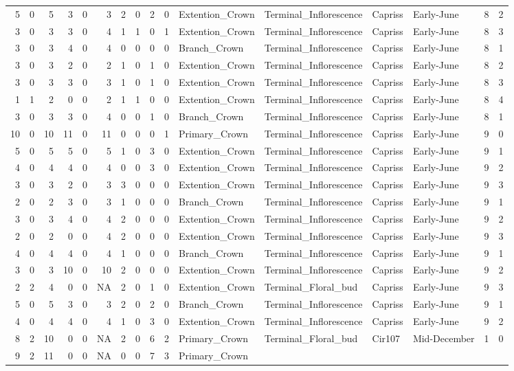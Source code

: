 \documentclass[]{article}
\begin{document}
\begin{longtable}[]{@{}rrrrrrrrrrllllrl@{}}
5 & 0 & 5 & 3 & 0 & 3 & 2 & 0 & 2 & 0 & Extention\_Crown &
Terminal\_Inflorescence & Capriss & Early-June & 8 & 2\tabularnewline
3 & 0 & 3 & 3 & 0 & 4 & 1 & 1 & 0 & 1 & Extention\_Crown &
Terminal\_Inflorescence & Capriss & Early-June & 8 & 3\tabularnewline
3 & 0 & 3 & 4 & 0 & 4 & 0 & 0 & 0 & 0 & Branch\_Crown &
Terminal\_Inflorescence & Capriss & Early-June & 8 & 1\tabularnewline
3 & 0 & 3 & 2 & 0 & 2 & 1 & 0 & 1 & 0 & Extention\_Crown &
Terminal\_Inflorescence & Capriss & Early-June & 8 & 2\tabularnewline
3 & 0 & 3 & 3 & 0 & 3 & 1 & 0 & 1 & 0 & Extention\_Crown &
Terminal\_Inflorescence & Capriss & Early-June & 8 & 3\tabularnewline
1 & 1 & 2 & 0 & 0 & 2 & 1 & 1 & 0 & 0 & Extention\_Crown &
Terminal\_Inflorescence & Capriss & Early-June & 8 & 4\tabularnewline
3 & 0 & 3 & 3 & 0 & 4 & 0 & 0 & 1 & 0 & Branch\_Crown &
Terminal\_Inflorescence & Capriss & Early-June & 8 & 1\tabularnewline
10 & 0 & 10 & 11 & 0 & 11 & 0 & 0 & 0 & 1 & Primary\_Crown &
Terminal\_Inflorescence & Capriss & Early-June & 9 & 0\tabularnewline
5 & 0 & 5 & 5 & 0 & 5 & 1 & 0 & 3 & 0 & Extention\_Crown &
Terminal\_Inflorescence & Capriss & Early-June & 9 & 1\tabularnewline
4 & 0 & 4 & 4 & 0 & 4 & 0 & 0 & 3 & 0 & Extention\_Crown &
Terminal\_Inflorescence & Capriss & Early-June & 9 & 2\tabularnewline
3 & 0 & 3 & 2 & 0 & 3 & 3 & 0 & 0 & 0 & Extention\_Crown &
Terminal\_Inflorescence & Capriss & Early-June & 9 & 3\tabularnewline
2 & 0 & 2 & 3 & 0 & 3 & 1 & 0 & 0 & 0 & Branch\_Crown &
Terminal\_Inflorescence & Capriss & Early-June & 9 & 1\tabularnewline
3 & 0 & 3 & 4 & 0 & 4 & 2 & 0 & 0 & 0 & Extention\_Crown &
Terminal\_Inflorescence & Capriss & Early-June & 9 & 2\tabularnewline
2 & 0 & 2 & 0 & 0 & 4 & 2 & 0 & 0 & 0 & Extention\_Crown &
Terminal\_Inflorescence & Capriss & Early-June & 9 & 3\tabularnewline
4 & 0 & 4 & 4 & 0 & 4 & 1 & 0 & 0 & 0 & Branch\_Crown &
Terminal\_Inflorescence & Capriss & Early-June & 9 & 1\tabularnewline
3 & 0 & 3 & 10 & 0 & 10 & 2 & 0 & 0 & 0 & Extention\_Crown &
Terminal\_Inflorescence & Capriss & Early-June & 9 & 2\tabularnewline
2 & 2 & 4 & 0 & 0 & NA & 2 & 0 & 1 & 0 & Extention\_Crown &
Terminal\_Floral\_bud & Capriss & Early-June & 9 & 3\tabularnewline
5 & 0 & 5 & 3 & 0 & 3 & 2 & 0 & 2 & 0 & Branch\_Crown &
Terminal\_Inflorescence & Capriss & Early-June & 9 & 1\tabularnewline
4 & 0 & 4 & 4 & 0 & 4 & 1 & 0 & 3 & 0 & Extention\_Crown &
Terminal\_Inflorescence & Capriss & Early-June & 9 & 2\tabularnewline
8 & 2 & 10 & 0 & 0 & NA & 2 & 0 & 6 & 2 & Primary\_Crown &
Terminal\_Floral\_bud & Cir107 & Mid-December & 1 & 0\tabularnewline
9 & 2 & 11 & 0 & 0 & NA & 0 & 0 & 7 & 3 & Primary\_Crown &

\end{longtable}
\end{document}
